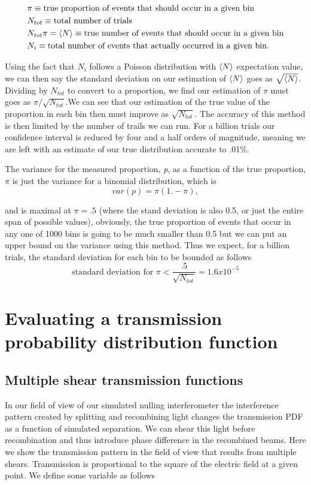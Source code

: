 \documentclass{article}
\begin{document}
	\begin{align*}
	&\pi \equiv \mbox{true proportion of events that should occur in a given bin}\\
	&N_{tot} \equiv \mbox{total number of trials}\\
	&N_{tot}\pi = \braket{N} \equiv \mbox{true number of events that should occur in a given bin}\\
	&N_i \equiv \mbox{total number of events that actually occurred in a given bin}.
	\end{align*}
	
	Using the fact that $N_i$ follows a Poisson distribution with $\braket{N}$ expectation value, we can then say the standard deviation on our estimation of $\braket{N}$ goes as $\sqrt{\braket{N}}$. Dividing by $N_{tot}$ to convert to a proportion, we find our estimation of $\pi$ must goes as $\pi /\sqrt{N_{tot}}$.We can see that our estimation of the true value of the proportion in each bin then must improve as $\sqrt{N_{tot}}$. The accuracy of this method is then limited by the number of trails we can run. For a billion trials our confidence interval is reduced by four and a half orders of magnitude, meaning we are left with an estimate of our true distribution accurate to .01\%. 
	
	The variance for the measured proportion, \textit{p}, as a function of the true proportion, $\pi$ is just the variance for a binomial distribution, which is
	\begin{equation}
	var(p) = \pi(1. - \pi),
	\end{equation}

and is maximal at $\pi = .5$ (where the stand deviation is also 0.5, or just the entire span of possible values), obviously, the true proportion of events that occur in any one of 1000 bins is going to be much smaller than 0.5 but we can put an upper bound on the variance using this method. Thus we expect, for a billion trials, the standard deviation for each bin to be bounded as follows 
	\begin{equation}
	\mbox{standard deviation for $\pi$} < \frac{.5}{\sqrt{N_{tot}}} = 1.6 x 10^{-5}
	\end{equation}

	
	\section{Evaluating a transmission probability distribution function}
	\subsection{Multiple shear transmission functions}
	In our field of view of our simulated nulling interferometer the interference pattern created by splitting and recombining light changes the transmission PDF as a function of simulated separation. We can shear this light before recombination and thus introduce phase difference in the recombined beams. Here we show the transmission pattern in the field of view that results from multiple shears. Transmission is proportional to the square of the electric field at a given point. We define some variable as follows
	
\end{document}
